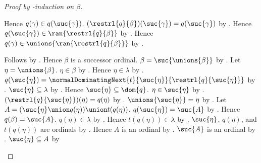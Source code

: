\begin{proof}[Proof by \in-induction on $\beta$]
\begin{byCase}
\begin{byCase}
\begin{subproof}
                        Hence $q(\gamma)\in q(\suc{\gamma})$.
                        $(\restrl{q}{\beta})(\suc{\gamma})
                            =q(\suc{\gamma})$ by
                            .
                        Hence $q(\suc{\gamma})
                            \in\ran{\restrl{q}{\beta}}$ by
                            .
                        Hence $q(\gamma)\in
                            \unions{\ran{\restrl{q}{\beta}}}$ by
                            .
                    \end{subproof}
                    Follows by \auto.
                    Hence $\beta$ is a successor ordinal.
                    $\beta=\suc{\unions{\beta}}$ by
                        .
                    Let $\eta=\unions{\beta}$.
                    $\eta\in\beta$ by
                        .
                    Hence $\eta\in\lambda$ by
                        .
                    $q(\suc{\eta})=
                        \normalDominatingNext{t}{\suc{\eta}}
                            {\restrl{q}{\suc{\eta}}}$ by
                        .
                    $\suc{\eta}\subseteq\lambda$ by
                        .
                    Hence $\suc{\eta}\subseteq\dom{q}$.
                    $\eta\in\suc{\eta}$ by .
                    $(\restrl{q}{\suc{\eta}})(\eta)=q(\eta)$ by
                        .
                    $\unions{\suc{\eta}}=\eta$ by
                        .
                    Let $A=(\suc{\eta}\union q(\eta))
                        \union t(q(\eta))$.
                    $q(\suc{\eta})=\suc{A}$ by
                        .
                    Hence $q(\beta)=\suc{A}$.
                    $q(\eta)\in\lambda$ by .
                    Hence $t(q(\eta))\in\lambda$ by
                        .
                    $\suc{\eta}$, $q(\eta)$, and $t(q(\eta))$
                        are ordinals by .
                    Hence $A$ is an ordinal by
                        .
                    $\suc{A}$ is an ordinal by .
                    $\suc{\eta}\subseteq A$ by

\end{byCase}
\end{byCase}
\end{proof}

